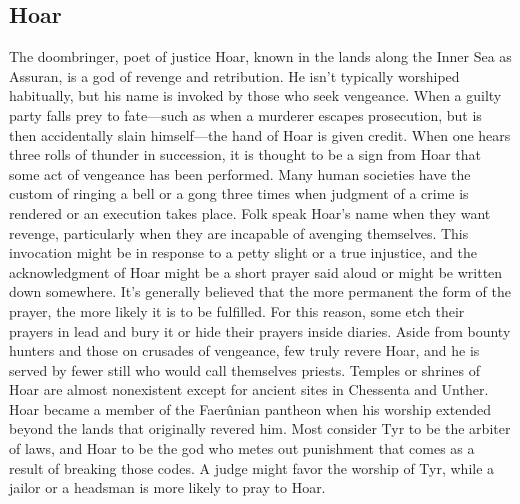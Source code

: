 \documentclass[10pt,a4paper,twoside,twocolumn,openany,bg=print,nodeprecatedcode]{dndbook}
\begin{document}
\subsection{Hoar}
The doombringer, poet of justice
Hoar, known in the lands along the Inner Sea as Assuran, is a god of revenge and retribution. He isn't typically worshiped habitually, but his name is invoked by those who seek vengeance. When a guilty party falls prey to fate—such as when a murderer escapes prosecution, but is then accidentally slain himself—the hand of Hoar is given credit. When one hears three rolls of thunder in succession, it is thought to be a sign from Hoar that some act of vengeance has been performed. Many human societies have the custom of ringing a bell or a gong three times when judgment of a crime is rendered or an execution takes place.
Folk speak Hoar's name when they want revenge, particularly when they are incapable of avenging themselves. This invocation might be in response to a petty slight or a true injustice, and the acknowledgment of Hoar might be a short prayer said aloud or might be written down somewhere. It's generally believed that the more permanent the form of the prayer, the more likely it is to be fulfilled. For this reason, some etch their prayers in lead and bury it or hide their prayers inside diaries. Aside from bounty hunters and those on crusades of vengeance, few truly revere Hoar, and he is served by fewer still who would call themselves priests. Temples or shrines of Hoar are almost nonexistent except for ancient sites in Chessenta and Unther.
Hoar became a member of the Faerûnian pantheon when his worship extended beyond the lands that originally revered him. Most consider Tyr to be the arbiter of laws, and Hoar to be the god who metes out punishment that comes as a result of breaking those codes. A judge might favor the worship of Tyr, while a jailor or a headsman is more likely to pray to Hoar.
\end{document}
